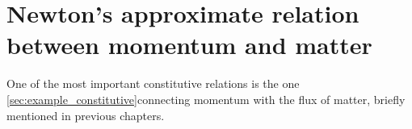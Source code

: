 \documentclass[a4paper,12pt,%
onecolumn,oneside,%
british%
]{memoir}
\providecommand{\href}[2]{#2}
\renewcommand*{\bm}[1]{\textpdfrender{TextRenderingMode=2,LineWidth=0.2pt}{\boldsymbol{#1}}}
\renewcommand*{\|}[1][]{\nonscript\:#1\vert\nonscript\:\mathopen{}}
\newcommand*{\sect}{\S}%
\newcommand*{\furl}[2]{\href{#1}{#2}\pagenote{\url{#1}}}
\renewcommand*{\autoref}[3][\sect\,\ref]{\textcolor{blue}{#3} {\color{blue}\scriptsize(\faIcon[regular]{eye}\;#1{#2}\;p.\,\pageref{#2})}}
\newcommand*{\masse}{mass-energy}
\newcommand*{\yg}{\bm{g}} %
\newcommand*{\yN}{N}
\newcommand*{\yrho}{\rho}
\newcommand*{\ym}{m}%
\begin{document}
% 




\section{Newton's approximate relation between momentum and matter}
\label{sec:bal_momentum_Newton}

One of the most important constitutive relations is the one \ref{sec:example_constitutive}{connecting momentum with the flux of matter}, briefly mentioned in previous chapters.

\end{document}
